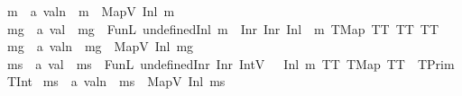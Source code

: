 \begin{isabellebody}
\isamarkupfalse%
\ m{}{}\ {\isacharcolon}{\kern0pt}{\isacharcolon}{\kern0pt}\ {\isachardoublequoteopen}{\isacharprime}{\kern0pt}a\ valn{\isachardoublequoteclose}\ \ {\isachardoublequoteopen}m{}{}\ {\isasymequiv}\ MapV\ {\isacharparenleft}{\kern0pt}Inl\ m{}{}{\isacharparenright}{\kern0pt}{\isachardoublequoteclose}\isanewline
\isanewline
{}\isamarkupfalse%
\ mg{}\ {\isacharcolon}{\kern0pt}{\isacharcolon}{\kern0pt}\ {\isachardoublequoteopen}{\isacharprime}{\kern0pt}a\ val{}{\isachardoublequoteclose}\ \ {\isachardoublequoteopen}mg{}\ {\isasymequiv}\ FunL\ {\isacharparenleft}{\kern0pt}undefined{\isacharparenleft}{\kern0pt}Inl\ m{}{}\ {\isacharcolon}{\kern0pt}{\isacharequal}{\kern0pt}\ Inr\ {\isacharparenleft}{\kern0pt}Inr\ {\isacharparenleft}{\kern0pt}Inl\ \ m{}{}{\isacharparenright}{\kern0pt}{\isacharparenright}{\kern0pt}{\isacharparenright}{\kern0pt}{\isacharparenright}{\kern0pt}\ {\isacharparenleft}{\kern0pt}TMap\ TT\ TT{\isacharparenright}{\kern0pt}\ TT{\isachardoublequoteclose}\isanewline
{}\isamarkupfalse%
\ mg{}\ {\isacharcolon}{\kern0pt}{\isacharcolon}{\kern0pt}\ {\isachardoublequoteopen}{\isacharprime}{\kern0pt}a\ valn{\isachardoublequoteclose}\ \ {\isachardoublequoteopen}mg{}\ {\isasymequiv}\ MapV\ {\isacharparenleft}{\kern0pt}Inl\ mg{}{\isacharparenright}{\kern0pt}{\isachardoublequoteclose}\isanewline
\isanewline
{}\isamarkupfalse%
\ ms{}\ {\isacharcolon}{\kern0pt}{\isacharcolon}{\kern0pt}\ {\isachardoublequoteopen}{\isacharprime}{\kern0pt}a\ val{}{\isachardoublequoteclose}\ \ {\isachardoublequoteopen}ms{}\ {\isasymequiv}\ FunL\ {\isacharparenleft}{\kern0pt}undefined{\isacharparenleft}{\kern0pt}Inr\ {\isacharparenleft}{\kern0pt}Inr\ {\isacharparenleft}{\kern0pt}IntV{}\ {}{\isacharparenright}{\kern0pt}{\isacharparenright}{\kern0pt}\ {\isacharcolon}{\kern0pt}{\isacharequal}{\kern0pt}\ Inl\ m{}{}{\isacharparenright}{\kern0pt}{\isacharparenright}{\kern0pt}\ TT\ {\isacharparenleft}{\kern0pt}TMap\ TT\ \ {\isacharparenleft}{\kern0pt}TPrim\ TInt{\isacharparenright}{\kern0pt}{\isacharparenright}{\kern0pt}{\isachardoublequoteclose}\isanewline
{}\isamarkupfalse%
\ ms{}\ {\isacharcolon}{\kern0pt}{\isacharcolon}{\kern0pt}\ {\isachardoublequoteopen}{\isacharprime}{\kern0pt}a\ valn{\isachardoublequoteclose}\ \ {\isachardoublequoteopen}ms{}\ {\isasymequiv}\ MapV\ {\isacharparenleft}{\kern0pt}Inl\ ms{}{\isacharparenright}{\kern0pt}{\isachardoublequoteclose}%

\end{isabellebody}
